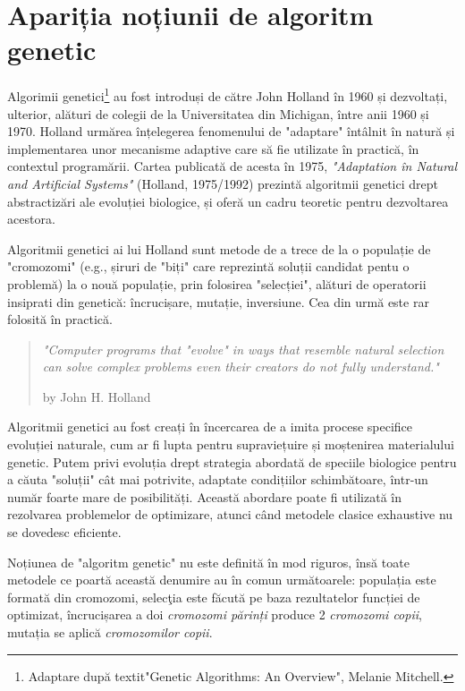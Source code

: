 \section{Apariția noțiunii de algoritm genetic} 
 
Algorimii genetici\footnote{Adaptare după textit{"Genetic Algorithms: An Overview"}, Melanie Mitchell.} au fost introduși de către John Holland în 1960 și dezvoltați, ulterior, alături de colegii de la Universitatea din Michigan, între anii 1960 și 1970. Holland urmărea înțelegerea fenomenului de "adaptare" întâlnit în natură și implementarea unor mecanisme adaptive care să fie utilizate în practică, în contextul programării. Cartea publicată de acesta în 1975, \textit{"Adaptation în Natural and Artificial Systems"} (Holland, 1975/1992) prezintă algoritmii genetici drept abstractizări ale evoluției biologice, și oferă un cadru teoretic pentru dezvoltarea acestora.

Algoritmii genetici ai lui Holland sunt metode de a trece de la o populație de "cromozomi" (e.g., șiruri de "biți" care reprezintă soluții candidat pentu o problemă) la o nouă populație, prin folosirea "selecției", alături de operatorii insiprati din genetică: încrucișare, mutație, inversiune. Cea din urmă este rar folosită în practică.

\begin{quote} 
	\textit{"Computer programs that "evolve" in ways that resemble natural selection can solve complex problems even their creators do not fully understand."}
	\begin{flushright}
		by John H. Holland 
	\end{flushright}
\end{quote}

Algoritmii genetici au fost creați în încercarea de a imita procese specifice evoluției naturale, cum ar fi lupta pentru supraviețuire și moștenirea materialului genetic. Putem privi evoluția drept strategia abordată de speciile biologice pentru a căuta "soluții" cât mai potrivite, adaptate condițiilor schimbătoare, într-un număr foarte mare de posibilități. Această abordare poate fi utilizată în rezolvarea problemelor de optimizare, atunci când metodele clasice exhaustive nu se dovedesc eficiente. 
 
Noțiunea de "algoritm genetic" nu este definită în mod riguros\cite{introduction_by_melanie_mitchell}, însă toate metodele ce poartă această denumire au în comun următoarele: populația este formată din cromozomi, selecţia este făcută pe baza rezultatelor funcției de optimizat, încrucișarea a doi \textit{cromozomi părinți} produce 2 \textit{cromozomi copii}, mutația se aplică \textit{cromozomilor copii}. 

